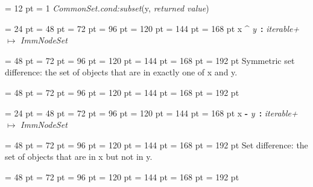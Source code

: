 {{{{{{{{\par \pagebreak[3.000000] \noindent \hangindent = 12 pt \hangafter = 1 
 {\em CommonSet.cond:subset\/}(y, {\em returned value\/})\par}
\par}
\par}
\par}
\par}
\par}
\par}
{\par \noindent  \leftskip = 24 pt  \leftmargini = 48 pt  \leftmarginii = 72 pt  \leftmarginiii = 96 pt  \leftmarginiv = 120 pt  \leftmarginv = 144 pt  \leftmarginvi = 168 pt x {\large {\bf {\textasciicircum}\/}} {\em y\/}~{\bf :}  {\em iterable+\/} \(\mapsto \)  {\em ImmNodeSet\/}{\par \noindent
{\par \noindent  \leftskip = 48 pt  \leftmargini = 72 pt  \leftmarginii = 96 pt  \leftmarginiii = 120 pt  \leftmarginiv = 144 pt  \leftmarginv = 168 pt  \leftmarginvi = 192 pt 
Symmetric set difference: the set of objects that are in exactly one of x and y.\par}
{\par \noindent  \leftskip = 48 pt  \leftmargini = 72 pt  \leftmarginii = 96 pt  \leftmarginiii = 120 pt  \leftmarginiv = 144 pt  \leftmarginv = 168 pt  \leftmarginvi = 192 pt {\par \noindent
\par}
\par}
\par}
\par}
{\par \noindent  \leftskip = 24 pt  \leftmargini = 48 pt  \leftmarginii = 72 pt  \leftmarginiii = 96 pt  \leftmarginiv = 120 pt  \leftmarginv = 144 pt  \leftmarginvi = 168 pt x {\large {\bf -\/}} {\em y\/}~{\bf :}  {\em iterable+\/} \(\mapsto \)  {\em ImmNodeSet\/}{\par \noindent
{\par \noindent  \leftskip = 48 pt  \leftmargini = 72 pt  \leftmarginii = 96 pt  \leftmarginiii = 120 pt  \leftmarginiv = 144 pt  \leftmarginv = 168 pt  \leftmarginvi = 192 pt 
Set difference: the set of objects that are in x but not in y.\par}
{\par \noindent  \leftskip = 48 pt  \leftmargini = 72 pt  \leftmarginii = 96 pt  \leftmarginiii = 120 pt  \leftmarginiv = 144 pt  \leftmarginv = 168 pt  \leftmarginvi = 192 pt {\par \noindent
}}}}}
